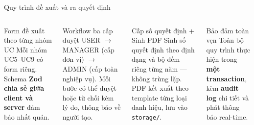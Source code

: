 \documentclass[aspectratio=43,xcolor=table]{beamer}
\begin{document}
\begin{frame}{Quy trình đề xuất và ra quyết định}
  \begin{columns}[T,onlytextwidth]
    \begin{block}{Form đề xuất theo từng nhóm UC}
      \scriptsize Mỗi nhóm UC5--UC9 có form riêng. Schema \textbf{Zod chia sẻ giữa client và server} đảm bảo nhất quán.
    \end{block}

    \begin{block}{Workflow ba cấp duyệt}
      \scriptsize USER $\to$ MANAGER (cấp đơn vị) $\to$ ADMIN (cấp toàn nghiệp vụ). Mỗi bước có thể duyệt hoặc từ chối kèm lý do, thông báo về người tạo.
    \end{block}

    \begin{block}{Cấp số quyết định + Sinh PDF}
      \scriptsize Sinh số quyết định theo định dạng và bộ đếm riêng từng năm --- không trùng lặp. PDF kết xuất theo template từng loại danh hiệu, lưu vào \texttt{storage/}.
    \end{block}

    \begin{block}{Bảo đảm toàn vẹn}
      \scriptsize \centering Toàn bộ quy trình thực hiện trong \textbf{một transaction}, kèm \textbf{audit log} chi tiết và phát thông báo real-time.
    \end{block}
  \end{columns}
\end{frame}
\end{document}
